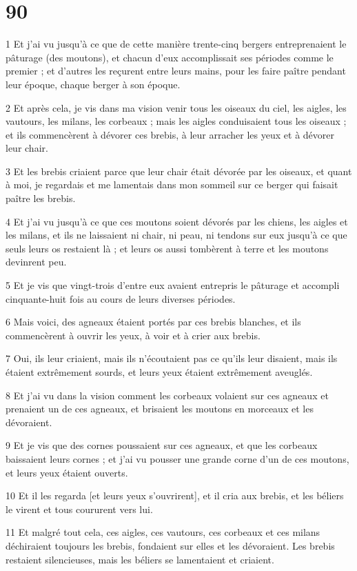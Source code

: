 \chapter{90}

\par 1 Et j'ai vu jusqu'à ce que de cette manière trente-cinq bergers entreprenaient le pâturage (des moutons), et chacun d'eux accomplissait ses périodes comme le premier ; et d'autres les reçurent entre leurs mains, pour les faire paître pendant leur époque, chaque berger à son époque.
\par 2 Et après cela, je vis dans ma vision venir tous les oiseaux du ciel, les aigles, les vautours, les milans, les corbeaux ; mais les aigles conduisaient tous les oiseaux ; et ils commencèrent à dévorer ces brebis, à leur arracher les yeux et à dévorer leur chair.
\par 3 Et les brebis criaient parce que leur chair était dévorée par les oiseaux, et quant à moi, je regardais et me lamentais dans mon sommeil sur ce berger qui faisait paître les brebis.
\par 4 Et j'ai vu jusqu'à ce que ces moutons soient dévorés par les chiens, les aigles et les milans, et ils ne laissaient ni chair, ni peau, ni tendons sur eux jusqu'à ce que seuls leurs os restaient là ; et leurs os aussi tombèrent à terre et les moutons devinrent peu.
\par 5 Et je vis que vingt-trois d'entre eux avaient entrepris le pâturage et accompli cinquante-huit fois au cours de leurs diverses périodes.
\par 6 Mais voici, des agneaux étaient portés par ces brebis blanches, et ils commencèrent à ouvrir les yeux, à voir et à crier aux brebis.
\par 7 Oui, ils leur criaient, mais ils n'écoutaient pas ce qu'ils leur disaient, mais ils étaient extrêmement sourds, et leurs yeux étaient extrêmement aveuglés.
\par 8 Et j'ai vu dans la vision comment les corbeaux volaient sur ces agneaux et prenaient un de ces agneaux, et brisaient les moutons en morceaux et les dévoraient.
\par 9 Et je vis que des cornes poussaient sur ces agneaux, et que les corbeaux baissaient leurs cornes ; et j'ai vu pousser une grande corne d'un de ces moutons, et leurs yeux étaient ouverts.
\par 10 Et il les regarda [et leurs yeux s'ouvrirent], et il cria aux brebis, et les béliers le virent et tous coururent vers lui.
\par 11 Et malgré tout cela, ces aigles, ces vautours, ces corbeaux et ces milans déchiraient toujours les brebis, fondaient sur elles et les dévoraient. Les brebis restaient silencieuses, mais les béliers se lamentaient et criaient.
